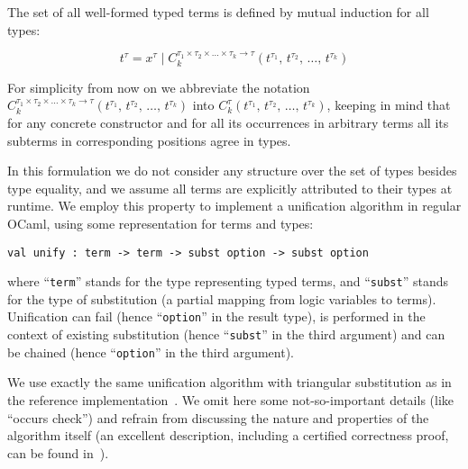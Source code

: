 The set of all well-formed typed terms is defined by mutual induction for all types:

$$
t^\tau=x^\tau\mid C_k^{\tau_1\times\tau_2\times\dots\times\tau_k\to\tau}(t^{\tau_1},\,t^{\tau_2},\,\dots,\,t^{\tau_k})
$$

For simplicity from now on we abbreviate the notation $C_k^{\tau_1\times\tau_2\times\dots\times\tau_k\to\tau}(t^{\tau_1},\,t^{\tau_2},\,\dots,\,t^{\tau_k})$ into
$C_k^\tau(t^{\tau_1},\,t^{\tau_2},\,\dots,\,t^{\tau_k})$, keeping in mind that for any concrete constructor and for all its occurrences
in arbitrary terms all its subterms in corresponding positions agree in types.

\begin{comment}
We need also to define the notion of a subterm  $t^\tau[p]$ of a term $t^\tau$ at given position $p$:

$$
\begin{array}{rcl}
 p=\epsilon\mid\{1, 2, 3,\dots\}\bullet p&-&\mbox{the set of positions}\\
 t^\tau[\epsilon]=t^\tau&-&\mbox{base case}\\
 C_k^\tau(t_1^{\tau_1},\,t_2^{\tau_2},\dots,\,t_k^{\tau_k})[i\bullet p]=t_i^{\tau_i}[p], 1\le i \le k&-&\mbox{inductive case}
\end{array}
$$
\end{comment}

In this formulation we do not consider any structure over the set of types besides type equality, and we assume all terms are explicitly
attributed to their types at runtime. We employ this property to implement a unification algorithm in regular OCaml, using some
representation for terms and types:

\begin{lstlisting}[mathescape=true]
    val unify : term -> term -> subst option -> subst option
\end{lstlisting}

\noindent where ``\lstinline{term}'' stands for the type representing typed terms, and ``\lstinline{subst}'' stands for the type of
substitution (a partial mapping from logic variables to terms). Unification can fail (hence ``\lstinline{option}'' in the result type),
is performed in the context of existing substitution (hence ``\lstinline{subst}'' in the third argument) and can be
chained (hence ``\lstinline{option}'' in the third argument).

We use exactly the same unification algorithm with triangular substitution as in the reference implementation~\cite{MicroKanren}. We
omit here some not-so-important details (like ``occurs check'') and refrain from discussing the nature and properties of the algorithm
itself (an excellent description, including a certified correctness proof, can be found in~\cite{Kumar}).

